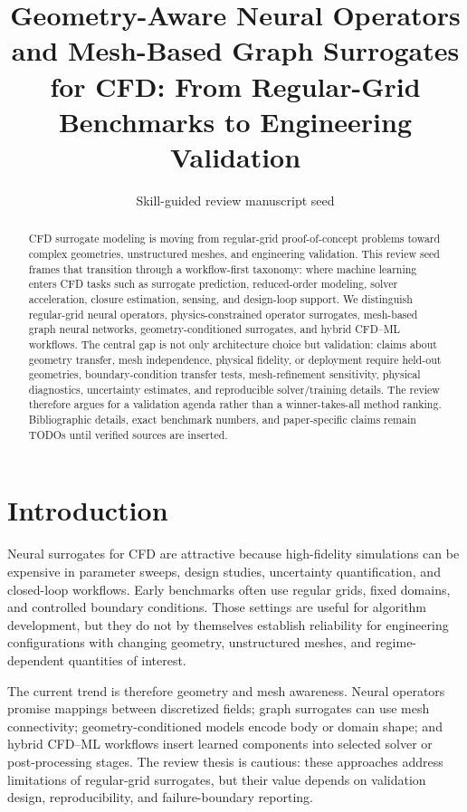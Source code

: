 \documentclass[11pt]{article}
\title{Geometry-Aware Neural Operators and Mesh-Based Graph Surrogates for CFD: From Regular-Grid Benchmarks to Engineering Validation}
\author{Skill-guided review manuscript seed}
\date{}
\begin{document}
\maketitle

\begin{abstract}
CFD surrogate modeling is moving from regular-grid proof-of-concept problems toward complex geometries, unstructured meshes, and engineering validation. This review seed frames that transition through a workflow-first taxonomy: where machine learning enters CFD tasks such as surrogate prediction, reduced-order modeling, solver acceleration, closure estimation, sensing, and design-loop support. We distinguish regular-grid neural operators, physics-constrained operator surrogates, mesh-based graph neural networks, geometry-conditioned surrogates, and hybrid CFD--ML workflows. The central gap is not only architecture choice but validation: claims about geometry transfer, mesh independence, physical fidelity, or deployment require held-out geometries, boundary-condition transfer tests, mesh-refinement sensitivity, physical diagnostics, uncertainty estimates, and reproducible solver/training details. The review therefore argues for a validation agenda rather than a winner-takes-all method ranking. Bibliographic details, exact benchmark numbers, and paper-specific claims remain TODOs until verified sources are inserted.
\end{abstract}

\section{Introduction}
Neural surrogates for CFD are attractive because high-fidelity simulations can be expensive in parameter sweeps, design studies, uncertainty quantification, and closed-loop workflows. Early benchmarks often use regular grids, fixed domains, and controlled boundary conditions. Those settings are useful for algorithm development, but they do not by themselves establish reliability for engineering configurations with changing geometry, unstructured meshes, and regime-dependent quantities of interest.

The current trend is therefore geometry and mesh awareness. Neural operators promise mappings between discretized fields; graph surrogates can use mesh connectivity; geometry-conditioned models encode body or domain shape; and hybrid CFD--ML workflows insert learned components into selected solver or post-processing stages. The review thesis is cautious: these approaches address limitations of regular-grid surrogates, but their value depends on validation design, reproducibility, and failure-boundary reporting.
\end{document}
